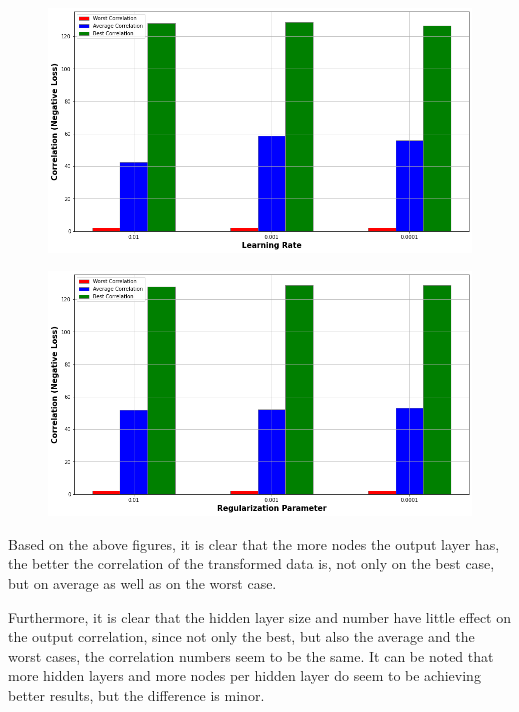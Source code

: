 {\begin{figure}[H]
    \caption{}
\end{figure}
\begin{figure}[H]
    \centering
    \includegraphics[width=\textwidth]{figures/DCCA_optimizations/Raw_Learning.png}
    \caption{}
\end{figure}
\begin{figure}[H]
    \centering
    \includegraphics[width=\textwidth]{figures/DCCA_optimizations/Raw_Regularization.png}
    \caption{}
\end{figure}


Based on the above figures, it is clear that the more nodes the output layer has, the better the correlation of the transformed data is, not only on the best case, but on average as well as on the worst case. 

Furthermore, it is clear that the hidden layer size and number have little effect on the output correlation, since not only the best, but also the average and the worst cases, the correlation numbers seem to be the same. It can be noted that more hidden layers and more nodes per hidden layer do seem to be achieving better results, but the difference is minor.  

}
